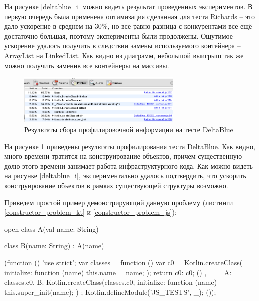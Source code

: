 На рисунке \ref{deltablue_i} можно видеть результат проведенных экспериментов. В первую очередь была применена оптимизация сделанная для теста Richards -- это дало ускорение в среднем на 30\%, но все равно разница с конкурентами все ещё достаточно большая, поэтому эксперименты были продолжены. Ощутимое ускорение удалось получить в следствии замены используемого контейнера -- ArrayList на LinkedList.
Как видно из диаграмм, небольшой выигрыш так же можно получить заменив все контейнеры на массивы. 

\begin{figure}[ht!]
\centering
\includegraphics[width=0.7\textwidth]{img/deltablue_0_profile.png}
\caption{Результаты сбора профилировочной информации на тесте DeltaBlue}
\label{deltablue_0_prifile}
\end{figure}

На рисунке \ref{deltablue_0_prifile} приведены результаты профилирования теста DeltaBlue. Как видно, много времени тратится на конструирование объектов, причем существенную долю этого времени занимает работа инфраструктурного кода. Как можно видеть на рисунке \ref{deltablue_i}, экспериментально удалось подтвердить, что ускорить конструирование объектов в рамках существующей структуры возможно.

\newpage
Приведем простой пример демонстрирующий данную проблему (листинги \ref{constructor_problem_kt} и \ref{constructor_problem_js}):

\begin{code}
\begin{Kotlin}[caption=Пример с наследованием, label=constructor_problem_kt]
open class A(val name: String)

class B(name: String) : A(name)
\end{Kotlin}
\end{code}

\begin{code}
\begin{JavaScript}[caption=Результат компиляции примера с наследованием, label=constructor_problem_js]
(function () {
  'use strict';
  var classes = function () {
    var c0 = Kotlin.createClass({
      initialize: function (name) {
        this.name = name;
      }
    });
    return {c0: c0};
  }()
  , _ = {
    A: classes.c0,
    B: Kotlin.createClass(classes.c0, {
      initialize: function (name) {
        this.super_init(name);
      }
    })
  };
  Kotlin.defineModule('JS_TESTS', _);
}());
\end{JavaScript}
\end{code}

